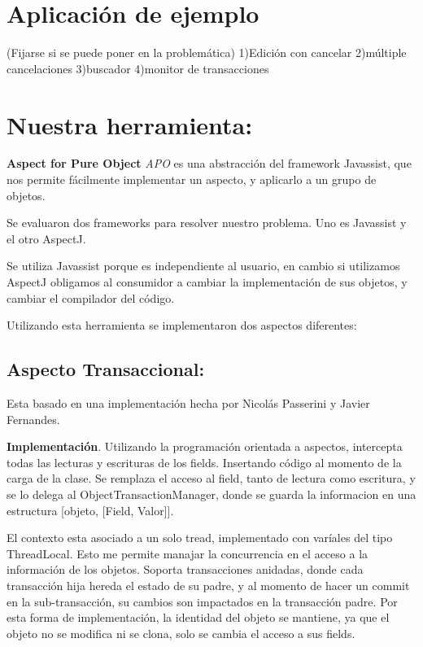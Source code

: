 \section{Aplicación de ejemplo}
(Fijarse si se puede poner en la problemática)
1)Edición con cancelar
2)múltiple cancelaciones
3)buscador
4)monitor de transacciones


\section{Nuestra herramienta: }
{\bf Aspect for Pure Object } \emph{APO} es una abstracción del framework
Javassist, que nos permite fácilmente implementar un aspecto, y aplicarlo a un grupo de
objetos.

\bigskip 

Se evaluaron dos frameworks para resolver nuestro problema. Uno es Javassist y
el otro AspectJ. \cite{KiczalesHHKPG01}

\bigskip

Se utiliza Javassist porque es independiente al usuario, en cambio si utilizamos
AspectJ obligamos al consumidor a cambiar la implementación de sus objetos,
y cambiar el compilador del código. 

\bigskip

Utilizando esta herramienta se implementaron dos aspectos diferentes:

	\subsection{Aspecto Transaccional:} Esta basado en una implementación
	hecha por Nicolás Passerini y Javier Fernandes.
	 
	{\bf Implementación}.
	Utilizando la programación orientada a aspectos, intercepta todas las lecturas
	y escrituras de los fields. Insertando código al momento de la carga de la 
	clase.
	Se remplaza el acceso al field, tanto de lectura como escritura, y se lo delega
	al ObjectTransactionManager, donde se guarda la informacion en una estructura
	[objeto, [Field, Valor]].
	
	\bigskip
	
	El contexto esta asociado a un solo tread, implementado con varíales del tipo
	ThreadLocal. Esto me permite manajar la concurrencia en el acceso a la
	información de los objetos. Soporta transacciones anidadas, donde cada
	transacción hija hereda el estado de su padre, y al momento de hacer un commit
	en la sub-transacción, su cambios son impactados en la transacción padre.
	Por esta forma de implementación, la identidad del objeto se mantiene, ya que
	el objeto no se modifica ni se clona, solo se cambia el acceso a sus fields.\\

